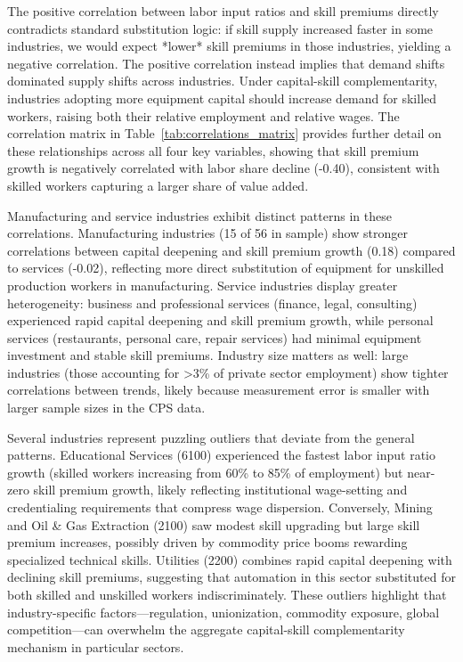 \documentclass[12pt]{article}
\begin{document}
The positive correlation between labor input ratios and skill premiums directly contradicts standard substitution logic: if skill supply increased faster in some industries, we would expect *lower* skill premiums in those industries, yielding a negative correlation. The positive correlation instead implies that demand shifts dominated supply shifts across industries. Under capital-skill complementarity, industries adopting more equipment capital should increase demand for skilled workers, raising both their relative employment and relative wages. The correlation matrix in Table~\ref{tab:correlations_matrix} provides further detail on these relationships across all four key variables, showing that skill premium growth is negatively correlated with labor share decline (-0.40), consistent with skilled workers capturing a larger share of value added.

Manufacturing and service industries exhibit distinct patterns in these correlations. Manufacturing industries (15 of 56 in sample) show stronger correlations between capital deepening and skill premium growth (0.18) compared to services (-0.02), reflecting more direct substitution of equipment for unskilled production workers in manufacturing. Service industries display greater heterogeneity: business and professional services (finance, legal, consulting) experienced rapid capital deepening and skill premium growth, while personal services (restaurants, personal care, repair services) had minimal equipment investment and stable skill premiums. Industry size matters as well: large industries (those accounting for >3\% of private sector employment) show tighter correlations between trends, likely because measurement error is smaller with larger sample sizes in the CPS data.

Several industries represent puzzling outliers that deviate from the general patterns. Educational Services (6100) experienced the fastest labor input ratio growth (skilled workers increasing from 60\% to 85\% of employment) but near-zero skill premium growth, likely reflecting institutional wage-setting and credentialing requirements that compress wage dispersion. Conversely, Mining and Oil \& Gas Extraction (2100) saw modest skill upgrading but large skill premium increases, possibly driven by commodity price booms rewarding specialized technical skills. Utilities (2200) combines rapid capital deepening with declining skill premiums, suggesting that automation in this sector substituted for both skilled and unskilled workers indiscriminately. These outliers highlight that industry-specific factors---regulation, unionization, commodity exposure, global competition---can overwhelm the aggregate capital-skill complementarity mechanism in particular sectors.
\end{document}
